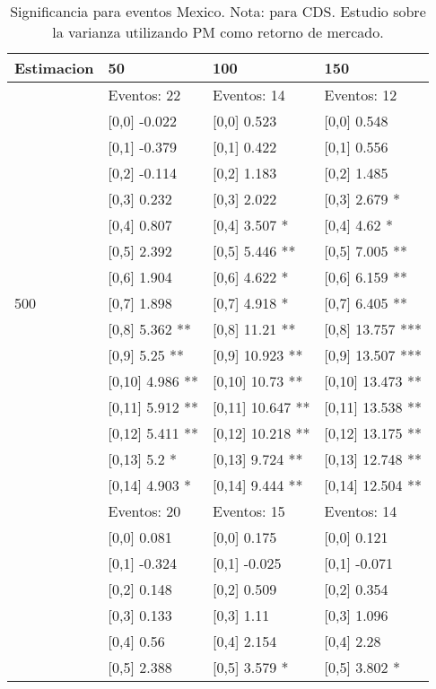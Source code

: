\begin{table}

\caption{Significancia para eventos Mexico. Nota: para CDS. Estudio sobre la varianza utilizando PM como retorno de mercado.}
\centering
\begin{tabular}[t]{llll}
\toprule
Estimacion & 50 & 100 & 150\\
\midrule
 & Eventos:  22 & Eventos:  14 & Eventos:  12\\
 & {}[0,0] -0.022 & {}[0,0] 0.523 & {}[0,0] 0.548\\
 & {}[0,1] -0.379 & {}[0,1] 0.422 & {}[0,1] 0.556\\
 & {}[0,2] -0.114 & {}[0,2] 1.183 & {}[0,2] 1.485\\
 & {}[0,3] 0.232 & {}[0,3] 2.022 & {}[0,3] 2.679 *\\
\addlinespace
 & {}[0,4] 0.807 & {}[0,4] 3.507 * & {}[0,4] 4.62 *\\
 & {}[0,5] 2.392 & {}[0,5] 5.446 ** & {}[0,5] 7.005 **\\
 & {}[0,6] 1.904 & {}[0,6] 4.622 * & {}[0,6] 6.159 **\\
500 & {}[0,7] 1.898 & {}[0,7] 4.918 * & {}[0,7] 6.405 **\\
 & {}[0,8] 5.362 ** & {}[0,8] 11.21 ** & {}[0,8] 13.757 ***\\
\addlinespace
 & {}[0,9] 5.25 ** & {}[0,9] 10.923 ** & {}[0,9] 13.507 ***\\
 & {}[0,10] 4.986 ** & {}[0,10] 10.73 ** & {}[0,10] 13.473 **\\
 & {}[0,11] 5.912 ** & {}[0,11] 10.647 ** & {}[0,11] 13.538 **\\
 & {}[0,12] 5.411 ** & {}[0,12] 10.218 ** & {}[0,12] 13.175 **\\
 & {}[0,13] 5.2 * & {}[0,13] 9.724 ** & {}[0,13] 12.748 **\\
\addlinespace
 & {}[0,14] 4.903 * & {}[0,14] 9.444 ** & {}[0,14] 12.504 **\\
 & Eventos:  20 & Eventos:  15 & Eventos:  14\\
 & {}[0,0] 0.081 & {}[0,0] 0.175 & {}[0,0] 0.121\\
 & {}[0,1] -0.324 & {}[0,1] -0.025 & {}[0,1] -0.071\\
 & {}[0,2] 0.148 & {}[0,2] 0.509 & {}[0,2] 0.354\\
\addlinespace
 & {}[0,3] 0.133 & {}[0,3] 1.11 & {}[0,3] 1.096\\
 & {}[0,4] 0.56 & {}[0,4] 2.154 & {}[0,4] 2.28\\
 & {}[0,5] 2.388 & {}[0,5] 3.579 * & {}[0,5] 3.802 *\\

\end{tabular}
\end{table}
